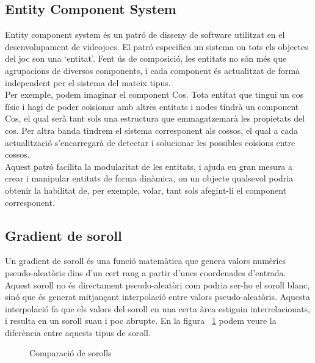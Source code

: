 \subsection{Entity Component System}
Entity component system és un patró de disseny de software utilitzat en el desenvolupament de videojocs. El patró especifica un sistema on tots els objectes del joc son una `entitat'. Fent ús de composició, les entitats no són més que agrupacions de diversos components, i cada component és actualitzat de forma independent per el sistema del mateix tipus.
\\
Per exemple, podem imaginar el component Cos. Tota entitat que tingui un cos físic i hagi de poder co\lgem isionar amb altres entitats i nodes tindrà un component Cos, el qual serà tant sols una estructura que emmagatzemarà les propietats del cos.
Per altra banda tindrem el sistema corresponent als cossos, el qual a cada actualització s'encarregarà de detectar i solucionar les possibles co\lgem isions entre cossos.
\\
Aquest patró facilita la modularitat de les entitats, i ajuda en gran mesura a crear i manipular entitats de forma dinàmica, on un objecte qualsevol podria obtenir la habilitat de, per exemple, volar, tant sols afegint-li el component corresponent.

\subsection{Gradient de soroll}
Un gradient de soroll és una funció matemàtica que genera valors numèrics pseudo-aleatòris dins d'un cert rang a partir d'unes coordenades d'entrada. Aquest soroll no és directament pseudo-aleatòri com podria ser-ho el soroll blanc, sinó que és generat mitjançant interpolació entre valors pseudo-aleatòris.
Aquesta interpolació fa que els valors del soroll en una certa àrea estiguin interrelacionats, i resulta en un soroll suau i poc abrupte.
En la figura ~\ref{fignoisecomparison} podem veure la diferència entre aquests tipus de soroll.
\begin{figure}[h]
  \hfill
  \hfill
  \hfill
  \caption{Comparació de sorolls}
  \label{fignoisecomparison}
\end{figure}

